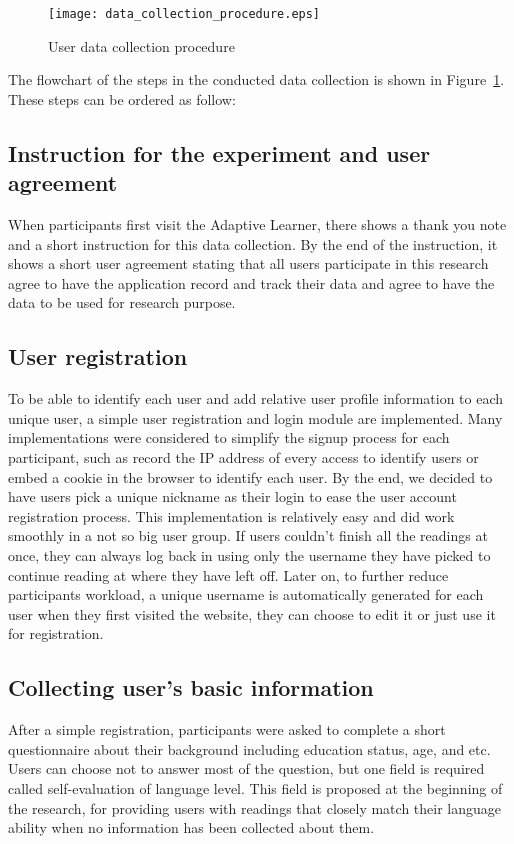 \begin{figure}[tbp]
 \begin{center}
  \texttt{[image: data\_collection\_procedure.eps]}
 \end{center}
 \caption{\label{figure:data_collection_procedure} User data collection procedure}
\end{figure}

The flowchart of the steps in the conducted data collection is shown in Figure~\ref{figure:data_collection_procedure}. These steps can be ordered as follow:

\subsection{Instruction for the experiment and user agreement}
\vspace{10pt}
When participants first visit the Adaptive Learner, there shows a thank you note and a short instruction for this data collection. By the end of the instruction, it shows a short user agreement stating that all users participate in this research agree to have the application record and track their data and agree to have the data to be used for research purpose. 

\subsection{User registration}
\vspace{10pt}
To be able to identify each user and add relative user profile information to each unique user, a simple user registration and login module are implemented. Many implementations were considered to simplify the signup process for each participant, such as record the IP address of every access to identify users or embed a cookie in the browser to identify each user. By the end, we decided to have users pick a unique nickname as their login to ease the user account registration process. This implementation is relatively easy and did work smoothly in a not so big user group. If users couldn't finish all the readings at once, they can always log back in using only the username they have picked to continue reading at where they have left off. Later on, to further reduce participants workload, a unique username is automatically generated for each user when they first visited the website, they can choose to edit it or just use it for registration.

\subsection{Collecting user's basic information}
\vspace{10pt}
After a simple registration, participants were asked to complete a short questionnaire about their background including education status, age, and etc. Users can choose not to answer most of the question, but one field is required called self-evaluation of language level. This field is proposed at the beginning of the research, for providing users with readings that closely match their language ability when no information has been collected about them. 

